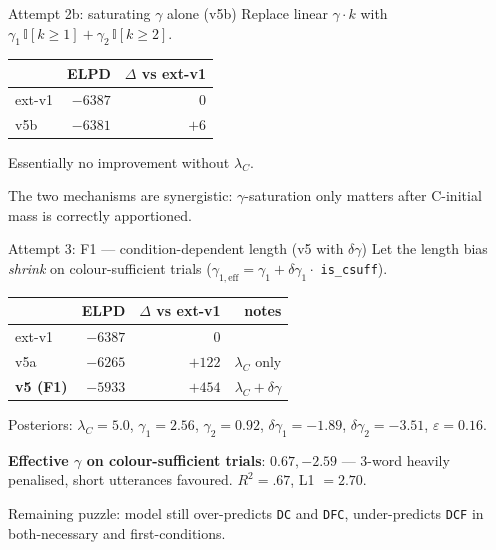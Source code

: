 \documentclass[10pt,aspectratio=169]{beamer}
\newcommand{\hl}[1]{{\color{hlblue}\textbf{#1}}}
\newcommand{\bad}[1]{{\color{hlred}#1}}
\begin{document}
\begin{frame}{Attempt 2b: saturating $\gamma$ alone (v5b)}
Replace linear $\gamma \cdot k$ with $\gamma_1 \,\mathbb{I}[k \geq 1] + \gamma_2\,\mathbb{I}[k \geq 2]$.

\vspace{0.5em}
\begin{center}
\begin{tabular}{lrr}
\toprule
& ELPD & $\Delta$ vs ext-v1\\
\midrule
ext-v1 & $-6387$ & 0 \\
v5b    & $-6381$ & \bad{$+6$} \\
\bottomrule
\end{tabular}
\end{center}

\vspace{0.5em}
\bad{Essentially no improvement without $\lambda_C$.}

\vspace{0.5em}
The two mechanisms are synergistic: $\gamma$-saturation only matters after C-initial mass is correctly apportioned.
\end{frame}

\begin{frame}{Attempt 3: F1 --- condition-dependent length (v5 with $\delta\gamma$)}
Let the length bias \emph{shrink} on colour-sufficient trials
($\gamma_{1,\mathrm{eff}} = \gamma_1 + \delta\gamma_1 \cdot$ \texttt{is\_csuff}).

\vspace{0.5em}
\begin{center}
\begin{tabular}{lrrr}
\toprule
& ELPD & $\Delta$ vs ext-v1 & notes\\
\midrule
ext-v1 & $-6387$ & 0 & \\
v5a    & $-6265$ & $+122$ & $\lambda_C$ only \\
\hl{v5 (F1)} & \hl{$-5933$} & \hl{$+454$} & $\lambda_C + \delta\gamma$  \\
\bottomrule
\end{tabular}
\end{center}

\vspace{0.5em}
Posteriors: $\lambda_C = 5.0$, $\gamma_1 = 2.56$, $\gamma_2 = 0.92$, $\delta\gamma_1 = -1.89$, $\delta\gamma_2 = -3.51$, $\varepsilon = 0.16$.

\vspace{0.5em}
\hl{Effective $\gamma$ on colour-sufficient trials}: $0.67, -2.59$ --- 3-word heavily penalised, short utterances favoured.
$R^2 = .67$, L1 $= 2.70$.

\vspace{0.5em}
\bad{Remaining puzzle:} model still over-predicts \texttt{DC} and \texttt{DFC}, under-predicts \texttt{DCF} in both-necessary and first-conditions.
\end{frame}
\end{document}
